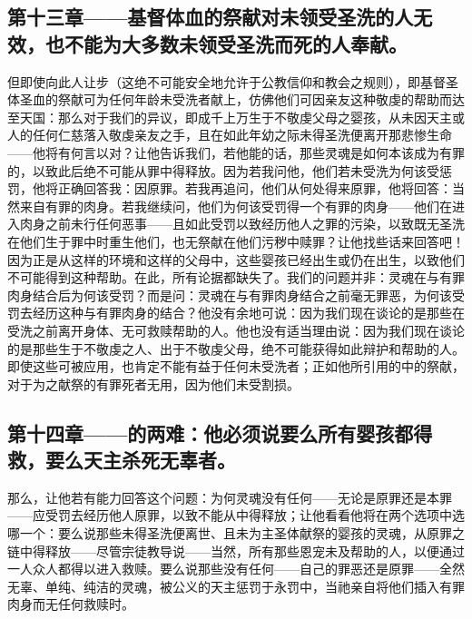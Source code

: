 
\subsection{第十三章——基督体血的祭献对未领受圣洗的人无效，也不能为大多数未领受圣洗而死的人奉献。}

但即使向此人让步（这绝不可能安全地允许于公教信仰和教会之规则），即基督圣体圣血的祭献可为任何年龄未受洗者献上，仿佛他们可因亲友这种敬虔的帮助而达至天国：那么对于我们的异议，即成千上万生于不敬虔父母之婴孩，从未因天主或人的任何仁慈落入敬虔亲友之手，且在如此年幼之际未得圣洗便离开那悲惨生命——他将有何言以对？让他告诉我们，若他能的话，那些灵魂是如何本该成为有罪的，以致此后绝不可能从罪中得释放。因为若我问他，他们若未受洗为何该受惩罚，他将正确回答我：因原罪。若我再追问，他们从何处得来原罪，他将回答：当然来自有罪的肉身。若我继续问，他们为何该受罚得一个有罪的肉身——他们在进入肉身之前未行任何恶事——且如此受罚以致经历他人之罪的污染，以致既无圣洗在他们生于罪中时重生他们，也无祭献在他们污秽中赎罪？让他找些话来回答吧！因为正是从这样的环境和这样的父母中，这些婴孩已经出生或仍在出生，以致他们不可能得到这种帮助。在此，所有论据都缺失了。我们的问题并非：灵魂在与有罪肉身结合后为何该受罚？而是问：灵魂在与有罪肉身结合之前毫无罪恶，为何该受罚去经历这种与有罪肉身的结合？他没有余地可说：因为我们现在谈论的是那些在受洗之前离开身体、无可救赎帮助的人。他也没有适当理由说：因为我们现在谈论的是那些生于不敬虔之人、出于不敬虔父母，绝不可能获得如此辩护和帮助的人。即使这些可被应用，也肯定不能有益于任何未受洗者；正如他所引用的中的祭献，对于为之献祭的有罪死者无用，因为他们未受割损。\par


\subsection{第十四章——的两难：他必须说要么所有婴孩都得救，要么天主杀死无辜者。}

那么，让他若有能力回答这个问题：为何灵魂没有任何——无论是原罪还是本罪——应受罚去经历他人原罪，以致不能从中得释放；让他看看他将在两个选项中选哪一个：要么说那些未得圣洗便离世、且未为主圣体献祭的婴孩的灵魂，从原罪之链中得释放——尽管宗徒教导说——当然，所有那些恩宠未及帮助的人，以便通过一人众人都得以进入救赎。要么说那些没有任何——自己的罪恶还是原罪——全然无辜、单纯、纯洁的灵魂，被公义的天主惩罚于永罚中，当祂亲自将他们插入有罪肉身而无任何救赎时。\par

